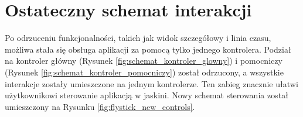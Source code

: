 \section{Ostateczny schemat interakcji}
\label{sec:schemat_interakcji}
Po odrzuceniu funkcjonalności, takich jak widok szczegółowy i linia czasu, możliwa stała się obsługa aplikacji za pomocą tylko jednego kontrolera. Podział na kontroler główny (Rysunek \ref{fig:schemat_kontroler_glowny}) i pomocniczy (Rysunek \ref{fig:schemat_kontroler_pomocniczy}) został odrzucony, a wszystkie interakcje zostały umieszczone na jednym kontrolerze. Ten zabieg znacznie ułatwi użytkownikowi sterowanie aplikacją w jaskini. Nowy schemat sterowania został umieszczony na Rysunku \ref{fig:flystick_new_controls}.

